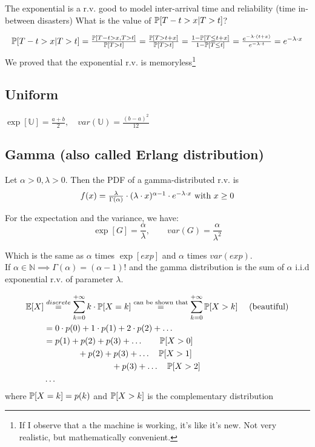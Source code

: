 The exponential is a r.v. good to model inter-arrival time and reliability (time in-between disasters)
What is the value of $\mathbb{P}[T-t > x | T>t]$?

\begin{equation}
  $$\prob[T-t > x | T>t]=\frac{\prob[T-t > x , T>t]}{\prob[T>t]}=\frac{\prob[T > t+x ]}{\prob[T>t]}=\frac{1-\prob[T \le t+x]}{1-\prob[T\le t]}=\frac{e^{-\lambda \cdot (t+x)}}{e^{-\lambda \cdot t}} = e^{-\lambda \cdot x}$$
\end{equation}
We proved that the exponential r.v. is memoryless\footnote{If I observe that a the machine is working, it's like it's new. Not very realistic, but mathematically convenient.}

\subsection{Uniform}
$\exp[\mathbb{U}]=\frac{a+b}{2},\quad var(\mathbb{U})=\frac{(b-a)^2}{12}$

\subsection{Gamma (also called Erlang distribution)}
Let $\alpha >0 , \lambda >0$. Then the PDF of a gamma-distributed r.v. is
\begin{equation}
  $$f(x) = \frac{\lambda}{\Gamma(\alpha)}\cdot (\lambda \cdot x)^{\alpha -1} \cdot e^{-\lambda \cdot x} \text{ with } x\ge 0$$
\end{equation}

For the expectation and the variance, we have: $$\exp[G]=\frac{\alpha}{\lambda}, \qquad var(G)=\frac{\alpha}{\lambda^2}$$

Which is the same as $\alpha$ times $\exp[exp]$ and $\alpha$ times $var(exp)$.
\\ If $\alpha \in \mathbb{N} \implies \Gamma(\alpha) = (\alpha-1)!$ and the gamma
distribution is the sum of $\alpha$ i.i.d exponential r.v. of parameter $\lambda$.

\begin{equation}
  \begin{split}
  \mathbb{E}[X] &\stackrel{discrete}{=} \sum\limits_{k=0}^{+\infty} k \cdot \mathbb{P}[X=k]
  \stackrel{\text{can be shown  that}}{=} \sum\limits_{k=0}^{+\infty} \mathbb{P}[X>k] \quad\text{  (beautiful)}\\
  &=0 \cdot p(0) + 1 \cdot p(1) + 2 \cdot p(2) + \dots \\
  &= p(1) + p(2) + p(3)+ \dots \qquad \mathbb{P}[X>0]\\
  & \qquad \qquad + p(2) + p(3) +\dots \quad \mathbb{P}[X>1]\\
  & \qquad \qquad \qquad \qquad + p(3)+ \dots \quad \mathbb{P}[X>2] \\
  & \dots
  \end{split}
\end{equation}
where $\mathbb{P}[X=k]=p(k)$ and $\mathbb{P}[X>k]$ is the complementary distribution

